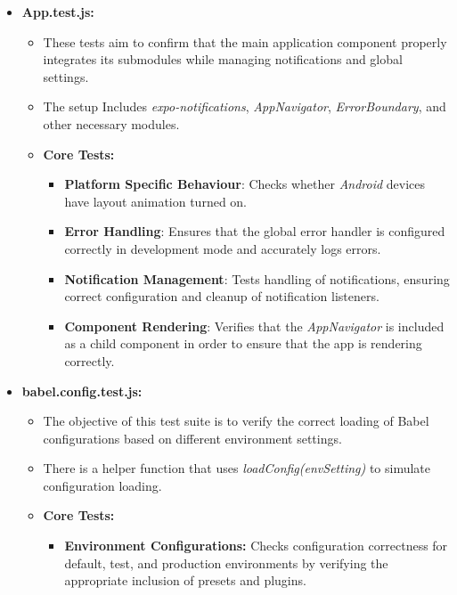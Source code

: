 \begin{itemize}
    \item \textbf{App.test.js:}
    \begin{itemize}
        \item These tests aim to confirm that the main application component properly integrates its submodules while managing notifications and global settings.
        \item The setup Includes \textit{expo-notifications}, \textit{AppNavigator}, \textit{ErrorBoundary}, and other necessary modules.
        \item \textbf{Core Tests:}
        \begin{itemize}
            \item \textbf{Platform Specific Behaviour}: Checks whether \textit{Android} devices have layout animation turned on.
            \item \textbf{Error Handling}: Ensures that the global error handler is configured correctly in development mode and accurately logs errors.
            \item \textbf{Notification Management}: Tests handling of notifications, ensuring correct configuration and cleanup of notification listeners.
            \item \textbf{Component Rendering}: Verifies that the \textit{AppNavigator} is included as a child component in order to ensure that the app is rendering correctly.
        \end{itemize}
    \end{itemize}

    \item \textbf{babel.config.test.js:}
    \begin{itemize}
        \item The objective of this test suite is to verify the correct loading of Babel configurations based on different environment settings.
        \item There is a helper function that uses \textit{loadConfig(envSetting)} to simulate configuration loading.
        \item \textbf{Core Tests:}
        \begin{itemize}
            \item \textbf{Environment Configurations:} Checks configuration correctness for default, test, and production environments by verifying the appropriate inclusion of presets and plugins.
        \end{itemize}
    \end{itemize}


\end{itemize}
